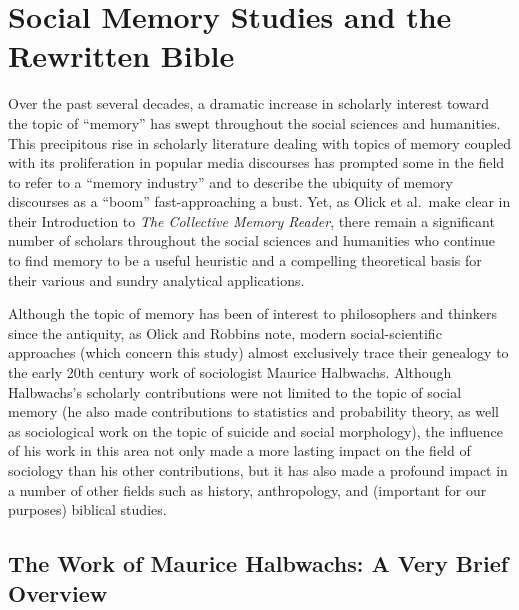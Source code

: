\hypertarget{social-memory-studies-and-the-rwb}{%
\chapter{Social Memory Studies and the
Rewritten Bible}\label{social-memory-studies-and-the-rwb}}

Over the past several decades, a dramatic increase in scholarly interest
toward the topic of ``memory'' has swept throughout the social sciences
and humanities. This precipitous rise in scholarly literature dealing
with topics of memory coupled with its proliferation in popular media
discourses has prompted some in the field to refer to a ``memory
industry'' and to describe the ubiquity of memory discourses as a
``boom'' fast-approaching a
bust.\autocites{rosenfeld_jmh2009}{winter2006}{berliner_aq2005}{confino_ahr1997}
Yet, as Olick et al.~make clear in their Introduction to \emph{The
Collective Memory Reader}, there remain a significant number of scholars
throughout the social sciences and humanities who continue to find
memory to be a useful heuristic and a compelling theoretical basis for
their various and sundry analytical
applications.\autocite[3--6]{olick_olick-etal2011}

Although the topic of memory has been of interest to philosophers and
thinkers since the antiquity,\autocite{carruthers_radstone-schwarz2011}
as Olick and Robbins note, modern social-scientific approaches (which
concern this study) almost exclusively trace their genealogy to the
early 20th century work of sociologist
Maurice Halbwachs.\autocites[106]{olick-robbins_ars1998}[It should be
noted, however, that Halbwachs was not the first or only person to do
work on memory or the impact of social structures on memory.
See][8--36]{olick_olick-etal2011} Although Halbwachs's scholarly
contributions were not limited to the topic of social memory (he also
made contributions to statistics and probability theory, as well as
sociological work on the topic of suicide and social morphology), the
influence of his work in this area not only made a more lasting impact
on the field of sociology than his other contributions, but it has also
made a profound impact in a number of other fields such as history,
anthropology, and (important for our purposes) biblical
studies.\autocite[13--20]{coser_halbwachs1992}

\hypertarget{the-work-of-halbwachs-a-very-brief-overview}{%
\section{The Work of Maurice Halbwachs: A Very Brief
Overview}\label{the-work-of-halbwachs-a-very-brief-overview}}

